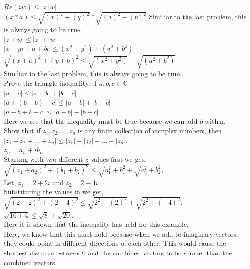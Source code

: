 \documentclass[12pt]{article}
\begin{document}
 $Re(z\bar{w}) \leq |z||w|$\\
$(x*a) \leq \sqrt{(x)^2 + (y)^2}*\sqrt{(a)^2 + (b)^2}$
Similiar to the last problem, this is always going to be true.\\


 $|z + w| \leq |z|+|w|$\\
$|x + yi + a + bi| \leq (x^2 + y^2) + (a^2 + b^2)$\\
$\sqrt{(x+a)^2 + (y+b)^2} \leq \sqrt{(x^2 + y^2)} + \sqrt{(a^2 + b^2)}$\\
Similiar to the last problem, this is always going to be true.\\

 Prove the triangle inequality: if $a,b,c \in \mathbb{C}$\\
$|a - c| \leq |a - b| + |b - c|$\\
$|a + (b - b) - c| \leq |a - b| + |b - c|$\\
$|a - b + b - c| \leq |a - b| + |b - c|$\\
Here we see that the inequality must be true because we can add $b$ within.\\


 Show that if $z_1,z_2,...,z_n$ is any finite collection of complex numbers, then\\
$|z_1 + z_2 + ... + z_n| \leq |z_1| + |z_2| + ... + |z_n|$.\\

$z_n = a_n + ib_n$\\

Starting with two different $z$ values first we get, 
$\sqrt{(a_1 + a_2)^2 + (b_1 + b_2)^2} \leq \sqrt{a_1^2 + b_1^2} + \sqrt{a_2^2 + b_2^2}$.\\

Let, $z_1 = 2 + 2i$ and $z_2 = 2 - 4i$.\\

Substituting the values in we get, $\sqrt{(2 + 2)^2 + (2 - 4)^2} \le \sqrt{2^2 + (2)^2} + \sqrt{2^2 + (-4)^2}$.\\
$\sqrt{16 + 4} \le \sqrt{8} + \sqrt{20}$.\\
Here it is shown that the inequality has held for this example.\\



Here, we know that this must hold because when we add to imaginary vectors, they could point in different directions of each other. 
This would cause the shortest distance between 0 and the combined vectors to be shorter than the combined vectors.\\
\end{document}
